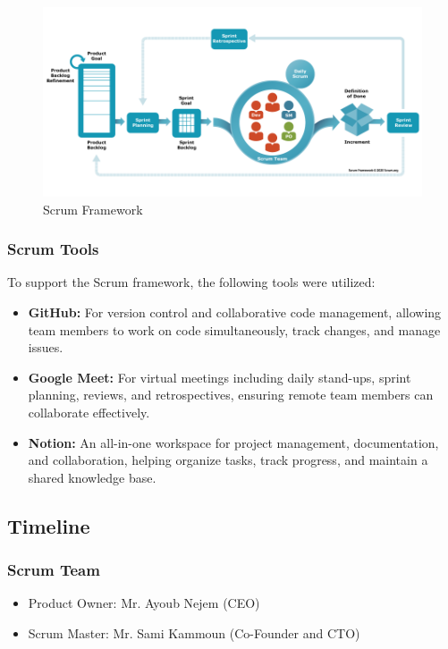 \begin{figure}[h]
  \centering
  \includegraphics[width=1\textwidth]{Images/scrum.png}
  \caption{Scrum Framework}
  \label{fig:Scrum Framework}
\end{figure}

\subsubsection{Scrum Tools}
To support the Scrum framework, the following tools were utilized:
\begin{itemize}
    \item \textbf{GitHub:} For version control and collaborative code management, allowing team members to work on code simultaneously, track changes, and manage issues.
    \item \textbf{Google Meet:} For virtual meetings including daily stand-ups, sprint planning, reviews, and retrospectives, ensuring remote team members can collaborate effectively.
    \item \textbf{Notion:} An all-in-one workspace for project management, documentation, and collaboration, helping organize tasks, track progress, and maintain a shared knowledge base.
\end{itemize}

\subsection{Timeline}
\subsubsection{Scrum Team}
\begin{itemize}
    \item Product Owner: Mr. Ayoub Nejem (CEO)
    \item Scrum Master: Mr. Sami Kammoun (Co-Founder and CTO)
\end{itemize}

